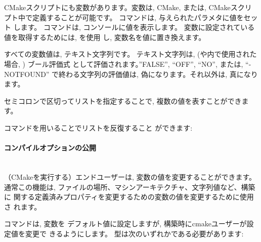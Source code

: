 \documentclass[11pt,a4paper,landscape]{ltjsarticle}
\newcommand{\sectiontitle}[1]{\paragraph{#1} \ \\} %
\begin{document}
\begin{multicols}{2}
CMakeスクリプトにも変数があります。変数は, CMake, または, CMakeスクリ
プト中で定義することが可能です。
 コマンドは, 与えられたパラメタに値をセット
します。
コマンドは, コンソールに値を表示します。
変数に設定されている値を取得するためには, を使用
し, 変数名を値に置き換えます。



すべての変数値は, テキスト文字列です。 テキスト文字列は,
(や内で使用された場合, ) ブール評価式
として評価されます。''FALSE'', ``OFF'', ``NO'', または, ``-NOTFOUND''
で終わる文字列の評価値は, 偽になります。それ以外は, 真になります。

セミコロンで区切ってリストを指定することで, 複数の値を表すことができま
す。



コマンドを用いることでリストを反復すること
ができます:

			
\sectiontitle{コンパイルオプションの公開}
			

（CMakeを実行する）エンドユーザーは, 変数の値を変更することができます。
通常この機能は, ファイルの場所、マシンアーキテクチャ、文字列値など、構築に
関する定義済みプロパティを変更するための変数の値を変更するために使用さ
れます。


コマンドは, 変数を
デフォルト値に設定しますが, 構築時にcmakeユーザーが設定値を変更で
きるようにします。
型は次のいずれかである必要があります:


\end{multicols}
\end{document}

